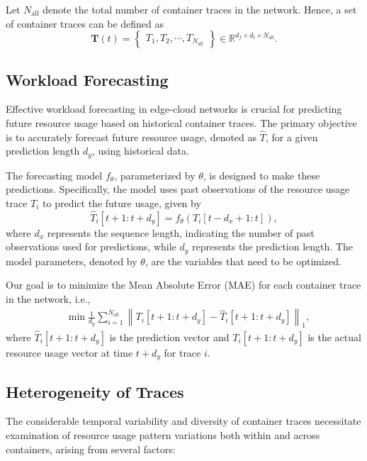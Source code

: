\documentclass{ieeetmlcn}
\begin{document}
Let \( N_{\text{all}} \) denote the total number of container traces in the network. Hence, a set of container traces can be defined as
\begin{equation}
\mathbf{T}(t) = \begin{Bmatrix} T_1, T_2, \cdots, T_{N_\text{all}} \end{Bmatrix} \in \mathbb{R}^{d_f \times d_t \times N_{\text{all}}}.
\end{equation}

\subsection{Workload Forecasting}

Effective workload forecasting in edge-cloud networks is crucial for predicting future resource usage based on historical container traces. The primary objective is to accurately forecast future resource usage, denoted as $\hat{T}$, for a given prediction length $d_y$, using historical data.

The forecasting model $f_\theta$, parameterized by $\theta$, is designed to make these predictions. Specifically, the model uses past observations of the resource usage trace $T_i$ to predict the future usage, given by
\begin{equation}
    \hat{T}_i[t + 1:t + d_y] = f_\theta\left(T_i[t - d_x + 1:t]\right),
\end{equation}
where $d_x$ represents the sequence length, indicating the number of past observations used for predictions, while $d_y$ represents the prediction length. The model parameters, denoted by $\theta$, are the variables that need to be optimized.

Our goal is to minimize the Mean Absolute Error (MAE) for each container trace in the network, i.e.,
\begin{align}
    &\min \frac{1}{d_y} \sum_{i=1}^{N_{\text{all}}} \left\| T_i[t + 1:t + d_y] - \hat{T}_i[t + 1:t + d_y] \right\|_1,
\end{align}
where $\hat{T}_i[t + 1:t + d_y]$ is the prediction vector and $T_i[t + 1:t + d_y]$ is the actual resource usage vector at time $t + d_y$ for trace $i$.

\subsection{Heterogeneity of Traces}
\label{sec: Container Trace Heterogeneity}

The considerable temporal variability and diversity of container traces necessitate examination of resource usage pattern variations both within and across containers, arising from several factors:
\end{document}
